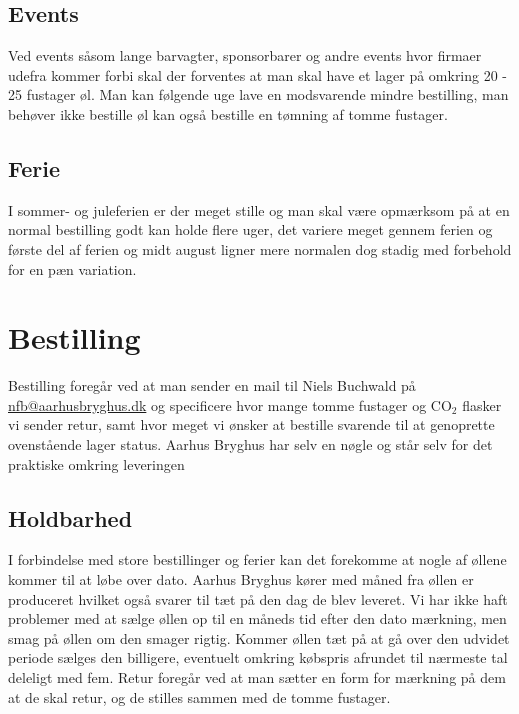 \subsection*{Events}

Ved events såsom lange barvagter, sponsorbarer og andre events hvor firmaer udefra kommer forbi skal der forventes
at man skal have et lager på omkring 20 - 25 fustager øl. Man kan følgende uge lave en modsvarende mindre bestilling,
man behøver ikke bestille øl kan også bestille en tømning af tomme fustager.

\subsection*{Ferie}

I sommer- og juleferien er der meget stille og man skal være opmærksom på at en normal bestilling
godt kan holde flere uger, det variere meget gennem ferien og første del af ferien og
midt august ligner mere normalen dog stadig med forbehold for en pæn variation.


\section{Bestilling}

Bestilling foregår ved at man sender en mail til Niels Buchwald på \\
\href{mailto:nfb@aarhusbryghus.dk}{nfb@aarhusbryghus.dk} og specificere hvor mange tomme fustager
og CO$_{2}$ flasker vi sender retur, samt hvor meget vi ønsker at bestille svarende til at genoprette
ovenstående lager status. Aarhus Bryghus har selv en nøgle og står selv for det praktiske omkring leveringen

\subsection{Holdbarhed}

I forbindelse med store bestillinger og ferier kan det forekomme at nogle af øllene kommer til at løbe over dato.
Aarhus Bryghus kører med måned fra øllen er produceret hvilket også svarer til tæt på den dag de blev leveret.
Vi har ikke haft problemer med at sælge øllen op til en måneds tid efter den dato mærkning, men smag på øllen
om den smager rigtig. Kommer øllen tæt på at gå over den udvidet periode sælges den billigere,
eventuelt omkring købspris afrundet til nærmeste tal deleligt med fem.
Retur foregår ved at man sætter en form for mærkning på dem at de skal retur, og de stilles sammen
med de tomme fustager.

